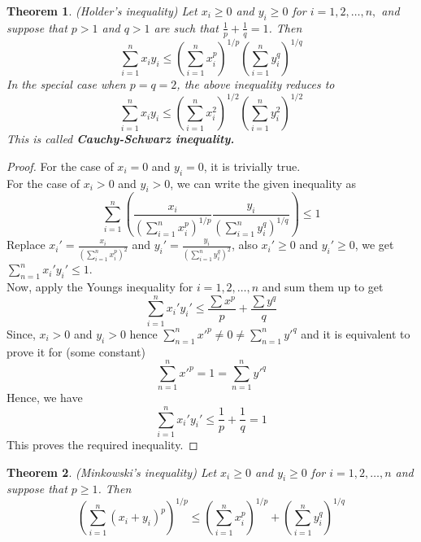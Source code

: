 \documentclass[12pt]{report}
\newtheorem{thm}{Theorem}
\theoremstyle{definition}
\begin{document}
\begin{thm}
    (Holder's inequality) Let $x_i \geq 0$ and $y_i \geq 0$ for $i = 1,2, \dots, n,$ and suppose that $p > 1$ and $q > 1$ are such that $\frac{1}{p} + \frac{1}{q} = 1$. Then
    $$ \sum\limits_{i=1}^n x_iy_i \leq \left(\sum\limits_{i=1}^nx_i^p\right)^{1/p} \left(\sum\limits_{i=1}^ny_i^q\right)^{1/q}$$
    In the special case when $p = q = 2$, the above inequality reduces to 
    $$ \sum\limits_{i=1}^n x_iy_i \leq \left(\sum\limits_{i=1}^nx_i^2\right)^{1/2} \left(\sum\limits_{i=1}^ny_i^2\right)^{1/2}$$
    This is called \textbf{Cauchy-Schwarz inequality.}
\end{thm}
\begin{proof}
    For the case of $x_i = 0$ and $y_i = 0$, it is trivially true.\\
    For the case of $x_i > 0$ and $y_i > 0$, we can write the given inequality as 
    $$ \sum\limits_{i = 1}^{n} \left(\frac{x_i}{\left(\sum\limits_{i = 1}^{n} x_i^p\right)^{1/p}} \frac{y_i}{\left(\sum\limits_{i = 1}^{n} y_i^q\right)^{1/q}} \right)\leq 1 $$
    Replace $ x_i' = \frac{x_i}{\left(\sum\limits_{i = 1}^{n} x_i^p\right)^2}$ and $y_i' = \frac{y_i}{\left(\sum\limits_{i = 1}^{n} y_i^q\right)^2} $, also $x_i' \geq 0$ and $y_i' \geq 0$, we get $ \sum\limits_{n = 1}^{n} x_i'y_i' \leq 1$. \\
    Now,  apply the Youngs inequality for $i = 1, 2, \dots, n$ and sum them up to get
    $$ \sum\limits_{i = 1}^{n} x_i'y_i' \leq \frac{\sum x^p}{p} + \frac{\sum y^q}{q}$$
    Since, $x_i > 0$ and $y_i > 0$ hence $\sum\limits_{n=1}^{n}x'^p \neq 0 \neq \sum\limits_{n=1}^{n}y'^q $ and it is equivalent to prove it for (some constant)
    $$ \sum\limits_{n=1}^{n}x'^p = 1 = \sum\limits_{n=1}^{n}y'^q $$
    Hence, we have
    $$ \sum\limits_{i = 1}^{n} x_i'y_i' \leq \frac{1}{p} + \frac{1}{q} = 1$$
    This proves the required inequality.
\end{proof}
\begin{thm}
    (Minkowski's inequality) Let $x_i \geq 0$ and $y_i \geq 0$ for $ i = 1,2,\dots, n$ and suppose that $p \geq 1$. Then
    $$ \left(\sum\limits_{i =1}^n(x_i + y_i)^p\right)^{1/p} \leq \left(\sum\limits_{i =1}^nx_i^p\right)^{1/p} + \left(\sum\limits_{i =1}^ny_i^q\right)^{1/q}$$  
\end{thm}
\end{document}
